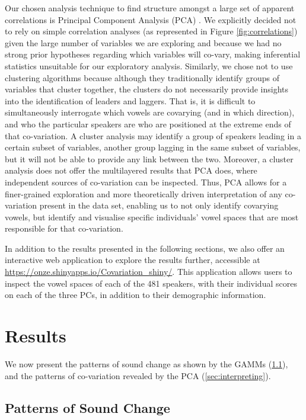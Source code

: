 \documentclass[review]{elsarticle} %
\begin{document}
Our chosen analysis technique to find structure amongst a large set of apparent correlations is Principal Component Analysis (PCA) \citep{venables2013modern, PCAIntro}. We explicitly decided not to rely on simple correlation analyses (as represented in Figure \ref{fig:correlations}) given the large number of variables we are exploring and because we had no strong prior hypotheses regarding which variables will co-vary, making inferential statistics unsuitable for our exploratory analysis. Similarly, we chose not to use clustering algorithms because although they traditionally identify groups of variables that cluster together, the clusters do not necessarily provide insights into the identification of leaders and laggers.   That is, it is difficult to simultaneously interrogate which vowels are covarying (and in which direction), and who the particular speakers are who are positioned at the extreme ends of that co-variation. A cluster analysis may identify a group of speakers leading in a certain subset of variables, another group lagging in the same subset of variables, but it will not be able to provide any link between the two. 
Moreover, a cluster analysis does not offer the multilayered results that PCA does, where independent sources of co-variation can be inspected. Thus, PCA allows for a finer-grained exploration and more theoretically driven interpretation of any co-variation present in the data set, enabling us to not only identify covarying vowels, but identify and visualise specific individuals' vowel spaces that are most responsible for that co-variation.

In addition to the results presented in the following sections, we also offer an interactive web application to explore the results further, accessible at \url{https://onze.shinyapps.io/Covariation_shiny/}. This application allows users to inspect the vowel spaces of each of the 481 speakers, with their individual scores on each of the three PCs, in addition to their demographic information.

\section{Results}

We now present the patterns of sound change as shown by the GAMMs (\ref{sec:soundchange}), and the patterns of co-variation revealed by the PCA (\ref{sec:interpreting}).

\subsection{Patterns of Sound Change}
\label{sec:soundchange}
\end{document}
